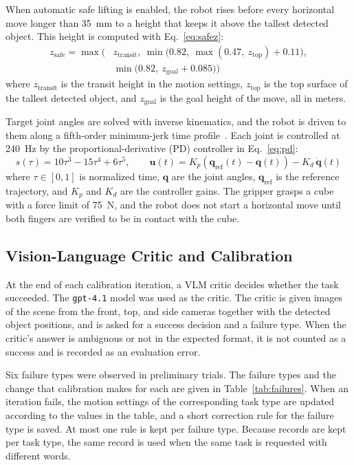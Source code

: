\documentclass[preprint,12pt]{elsarticle}
\begin{document}
When automatic safe lifting is enabled, the robot rises before every horizontal move longer than 35~mm to a height that keeps it above the tallest detected object. This height is computed with Eq.~\eqref{eq:safez}:
\begin{equation}
\begin{aligned}
z_{\text{safe}} = \max\Big(&z_{\text{transit}},\ \min\big(0.82,\ \max(0.47,\ z_{\text{top}}) + 0.11\big),\\
&\min\big(0.82,\ z_{\text{goal}} + 0.085\big)\Big)
\end{aligned}
\label{eq:safez}
\end{equation}
where $z_{\text{transit}}$ is the transit height in the motion settings, $z_{\text{top}}$ is the top surface of the tallest detected object, and $z_{\text{goal}}$ is the goal height of the move, all in meters.

Target joint angles are solved with inverse kinematics, and the robot is driven to them along a fifth-order minimum-jerk time profile~\cite{flash1985coordination}. Each joint is controlled at 240~Hz by the proportional-derivative (PD) controller in Eq.~\eqref{eq:pd}:
\begin{equation}
s(\tau) = 10\tau^3 - 15\tau^4 + 6\tau^5, \qquad \mathbf{u}(t) = K_p\left(\mathbf{q}_{\text{ref}}(t) - \mathbf{q}(t)\right) - K_d\,\dot{\mathbf{q}}(t)
\label{eq:pd}
\end{equation}
where $\tau \in [0, 1]$ is normalized time, $\mathbf{q}$ are the joint angles, $\mathbf{q}_{\text{ref}}$ is the reference trajectory, and $K_p$ and $K_d$ are the controller gains. The gripper grasps a cube with a force limit of 75~N, and the robot does not start a horizontal move until both fingers are verified to be in contact with the cube.

\subsection{Vision-Language Critic and Calibration}

At the end of each calibration iteration, a VLM critic decides whether the task succeeded. The \texttt{gpt-4.1} model was used as the critic. The critic is given images of the scene from the front, top, and side cameras together with the detected object positions, and is asked for a success decision and a failure type. When the critic's answer is ambiguous or not in the expected format, it is not counted as a success and is recorded as an evaluation error.

Six failure types were observed in preliminary trials. The failure types and the change that calibration makes for each are given in Table~\ref{tab:failures}. When an iteration fails, the motion settings of the corresponding task type are updated according to the values in the table, and a short correction rule for the failure type is saved. At most one rule is kept per failure type. Because records are kept per task type, the same record is used when the same task is requested with different words.
\end{document}
